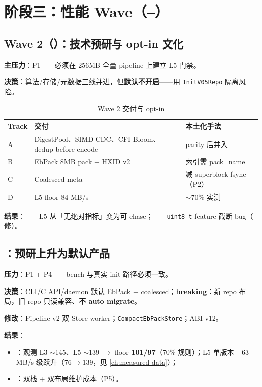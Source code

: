\chapter{阶段三：性能 Wave（--）}
\label{ch:phase-waves}

\section{Wave 2（）：技术预研与 opt-in 文化}

\textbf{主压力}：P1——必须在 256MB 全量 pipeline 上建立 L5 门禁。

\textbf{决策}：算法/存储/元数据三线并进，但\textbf{默认不开启}——用 \texttt{InitV05Repo} 隔离风险。

\begin{table}[htbp]
\centering
\caption{Wave 2 交付与 opt-in}
\begin{tabular}{@{}llp{6cm}@{}}
\toprule
Track & 交付 & 本土化手法 \\
\midrule
A & DigestPool、SIMD CDC、CFI Bloom、dedup-before-encode & parity 后并入 \\
B & EbPack 8MB pack + HXID v2 & 索引需 pack\_name \\
C & Coalesced meta & 减 superblock fsync（P2） \\
D & L5 floor 84 MB/s & $\sim$70\% 实测 \\
\bottomrule
\end{tabular}
\end{table}

\textbf{结果}：——L5 从「无绝对指标」变为可 chase；——\texttt{uint8\_t} feature 截断 bug（ 修）。

\section{：预研上升为默认产品}

\textbf{压力}：P1 + P4——bench 与真实 init 路径必须一致。

\textbf{决策}：CLI/C API/daemon 默认 EbPack + coalesced；\textbf{breaking}：新 repo 布局，旧 repo 只读兼容、\textbf{不 auto migrate}。

\textbf{修改}：Pipeline v2 双 Store worker；\texttt{CompactEbPackStore}；ABI v12。

\textbf{结果}：
\begin{itemize}[nosep]
  \item {}：观测 L3 $\sim$145、L5 $\sim$139 $\rightarrow$ floor \textbf{101/97}（70\% 规则）；L5 单版本 +63 MB/s 级跃升（76$\rightarrow$139，见 \cref{ch:measured-data}）；
  \item {}：双栈 + 双布局维护成本（P5）。
\end{itemize}


